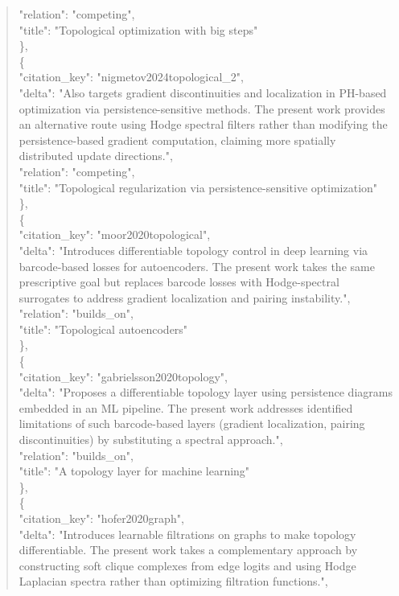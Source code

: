\documentclass[11pt]{article}
\begin{document}
\begin{quote}
      "relation": "competing",\\
      "title": "Topological optimization with big steps"\\
    \},\\
    \{\\
      "citation\_key": "nigmetov2024topological\_2",\\
      "delta": "Also targets gradient discontinuities and localization in PH-based optimization via persistence-sensitive methods. The present work provides an alternative route using Hodge spectral filters rather than modifying the persistence-based gradient computation, claiming more spatially distributed update directions.",\\
      "relation": "competing",\\
      "title": "Topological regularization via persistence-sensitive optimization"\\
    \},\\
    \{\\
      "citation\_key": "moor2020topological",\\
      "delta": "Introduces differentiable topology control in deep learning via barcode-based losses for autoencoders. The present work takes the same prescriptive goal but replaces barcode losses with Hodge-spectral surrogates to address gradient localization and pairing instability.",\\
      "relation": "builds\_on",\\
      "title": "Topological autoencoders"\\
    \},\\
    \{\\
      "citation\_key": "gabrielsson2020topology",\\
      "delta": "Proposes a differentiable topology layer using persistence diagrams embedded in an ML pipeline. The present work addresses identified limitations of such barcode-based layers (gradient localization, pairing discontinuities) by substituting a spectral approach.",\\
      "relation": "builds\_on",\\
      "title": "A topology layer for machine learning"\\
    \},\\
    \{\\
      "citation\_key": "hofer2020graph",\\
      "delta": "Introduces learnable filtrations on graphs to make topology differentiable. The present work takes a complementary approach by constructing soft clique complexes from edge logits and using Hodge Laplacian spectra rather than optimizing filtration functions.",\\

\end{quote}
\end{document}
